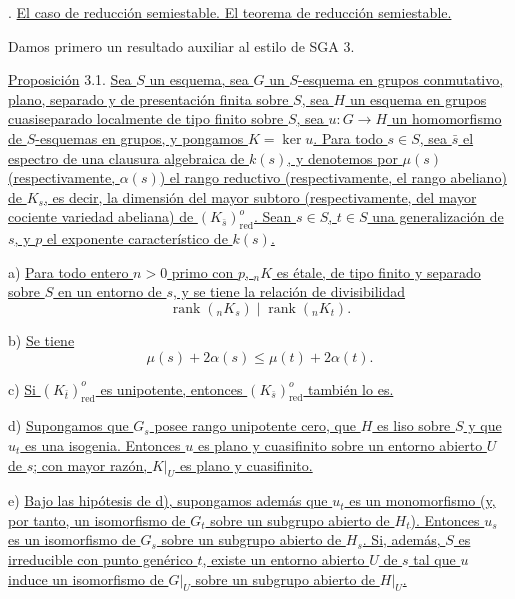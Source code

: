 \par\medskip
{}. \underline{El caso de reducción semiestable. El teorema de reducción
semiestable.}

Damos primero un resultado auxiliar al estilo de SGA 3.

\medskip
\noindent
\underline{Proposición} 3.1. \underline{Sea $S$ un esquema, sea $G$ un
$S$-esquema en grupos conmutativo, plano, separado y de presentación
finita sobre $S$, sea $H$ un esquema en grupos cuasiseparado localmente
de tipo finito sobre $S$, sea $u:G\longrightarrow H$ un homomorfismo de
$S$-esquemas en grupos, y pongamos $K=\ker u$. Para todo $s\in S$, sea
$\bar s$ el espectro de una clausura algebraica de $k(s)$, y denotemos
por $\mu(s)$ (respectivamente, $\alpha(s)$) el rango reductivo
(respectivamente, el rango abeliano) de $K_s$, es decir, la dimensión
del mayor subtoro (respectivamente, del mayor cociente variedad
abeliana) de $(K_{\bar s})^o_{\mathrm{red}}$. Sean $s\in S$, $t\in S$
una generalización de $s$, y $p$ el exponente característico de $k(s)$.}

\smallskip
\noindent
a) \underline{Para todo entero $n>0$ primo con $p$, ${}_nK$ es étale,
de tipo finito y separado sobre $S$ en un entorno de $s$, y se tiene la
relación de divisibilidad}
\begin{equation}\tag{3.1.1}
 \operatorname{rank}({}_nK_s)\mid \operatorname{rank}({}_nK_t).
\end{equation}

\noindent
b) \underline{Se tiene}
\begin{equation}\tag{3.1.2}
 \mu(s)+2\alpha(s)\leq \mu(t)+2\alpha(t).
\end{equation}

\noindent
c) \underline{Si $(K_{\bar t})^o_{\mathrm{red}}$ es unipotente,
entonces $(K_{\bar s})^o_{\mathrm{red}}$ también lo es.}

\smallskip
\noindent
d) \underline{Supongamos que $G_s$ posee rango unipotente cero, que
$H$ es liso sobre $S$ y que $u_t$ es una isogenia. Entonces $u$ es
plano y cuasifinito sobre un entorno abierto $U$ de $s$; con mayor
razón, $K|_U$ es plano y cuasifinito.}

\smallskip
\noindent
e) \underline{Bajo las hipótesis de d), supongamos además que $u_t$ es
un monomorfismo (y, por tanto, un isomorfismo de $G_t$ sobre un subgrupo
abierto de $H_t$). Entonces $u_s$ es un isomorfismo de $G_s$ sobre un
subgrupo abierto de $H_s$. Si, además, $S$ es irreducible con punto
genérico $t$, existe un entorno abierto $U$ de $s$ tal que $u$ induce
un isomorfismo de $G|_U$ sobre un subgrupo abierto de $H|_U$.}

